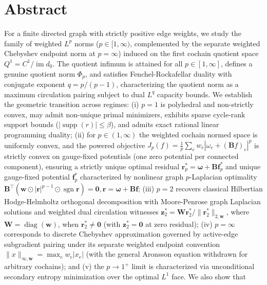 \documentclass[
]{article}
\begin{document}
\section*{Abstract}\label{abstract}

For a finite directed graph with strictly positive edge weights, we study the
family of weighted \(L^p\) norms (\(p \in [1, \infty)\), complemented by the separate weighted Chebyshev endpoint norm at \(p = \infty\)) induced on the first cochain
quotient space \(Q^1 = C^1 / \operatorname{im} d_0\). The quotient infimum is attained for all \(p \in [1, \infty]\),
defines a genuine quotient norm \(\Phi_p\), and satisfies Fenchel-Rockafellar duality with
conjugate exponent \(q = p/(p-1)\), characterizing the quotient norm as a maximum
circulation pairing subject to dual \(L^q\) capacity bounds. We establish the
geometric transition across regimes: (i) \(p = 1\) is polyhedral and non-strictly
convex, may admit non-unique primal minimizers, exhibits sparse cycle-rank support
bounds (\(|\operatorname{supp}(r)| \le \beta\)), and admits exact rational linear programming
duality; (ii) for \(p \in (1, \infty)\) the weighted cochain normed space is uniformly convex, and the powered objective \(J_p(f)=\frac1p\sum_e w_e|\omega_e+(\mathbf{B}f)_e|^p\) is strictly convex on gauge-fixed potentials (one zero potential per connected component), ensuring a strictly unique optimal residual \(\mathbf{r}_p^* = \boldsymbol{\omega} + \mathbf{B}\mathbf{f}_p^*\) and unique gauge-fixed potential \(\mathbf{f}_p^*\) characterized by nonlinear graph
\(p\)-Laplacian optimality \(\mathbf{B}^\top (\mathbf{w} \odot |\mathbf{r}|^{p-1} \odot \operatorname{sgn}\mathbf{r}) = \mathbf{0}, \mathbf{r} = \boldsymbol{\omega} + \mathbf{B}\mathbf{f}\);
(iii) \(p = 2\) recovers classical Hilbertian Hodge-Helmholtz orthogonal
decomposition with Moore-Penrose graph Laplacian solutions and weighted dual
circulation witnesses \(\mathbf{z}_2^* = \mathbf{W}\mathbf{r}_2^* / \|\mathbf{r}_2^*\|_{2,\mathbf{w}}\), where \(\mathbf{W}=\operatorname{diag}(\mathbf{w})\), when \(\mathbf{r}_2^* \ne \mathbf{0}\) (with \(\mathbf{z}_2^* = \mathbf{0}\) at zero residual); (iv) \(p = \infty\) corresponds to discrete Chebyshev
approximation governed by active-edge subgradient pairing under its separate weighted endpoint convention \(\|x\|_{\infty,\mathbf{w}} = \max_e w_e |x_e|\) (with the general Aronsson equation withdrawn for arbitrary cochains); and (v) the \(p \to 1^+\)
limit is characterized via unconditional secondary entropy minimization over the optimal \(L^1\) face. We also show that
\end{document}
